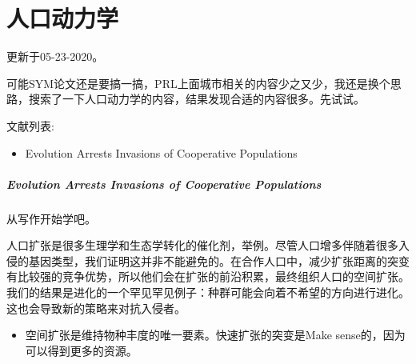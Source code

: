 \chapter{人口动力学}

更新于05-23-2020。

可能SYM论文还是要搞一搞，PRL上面城市相关的内容少之又少，我还是换个思路，搜索了一下人口动力学的内容，结果发现合适的内容很多。先试试。

文献列表:
\begin{itemize}
    \item Evolution Arrests Invasions of Cooperative Populations 
\end{itemize}

\paragraph{Evolution Arrests Invasions of Cooperative Populations}

从写作开始学吧。

人口扩张是很多生理学和生态学转化的催化剂，举例。尽管人口增多伴随着很多入侵的基因类型，我们证明这并非不能避免的。在合作人口中，减少扩张距离的突变有比较强的竞争优势，所以他们会在扩张的前沿积累，最终组织人口的空间扩张。我们的结果是进化的一个罕见罕见例子：种群可能会向着不希望的方向进行进化。这也会导致新的策略来对抗入侵者。

\begin{itemize}
    \item 空间扩张是维持物种丰度的唯一要素。快速扩张的突变是Make sense的，因为可以得到更多的资源。
\end{itemize}